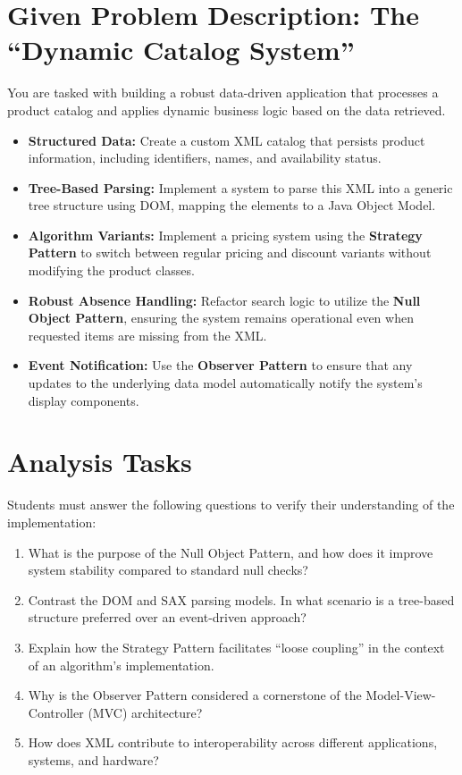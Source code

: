 \documentclass[11pt]{article}
\begin{document}
\section*{Given Problem Description: The ``Dynamic Catalog System''}
You are tasked with building a robust data-driven application that processes a product catalog and applies dynamic business logic based on the data retrieved.
\begin{itemize}
    \item \textbf{Structured Data:} Create a custom XML catalog that persists product information, including identifiers, names, and availability status.
    \item \textbf{Tree-Based Parsing:} Implement a system to parse this XML into a generic tree structure using DOM, mapping the elements to a Java Object Model.
    \item \textbf{Algorithm Variants:} Implement a pricing system using the \textbf{Strategy Pattern} to switch between regular pricing and discount variants without modifying the product classes.
    \item \textbf{Robust Absence Handling:} Refactor search logic to utilize the \textbf{Null Object Pattern}, ensuring the system remains operational even when requested items are missing from the XML.
    \item \textbf{Event Notification:} Use the \textbf{Observer Pattern} to ensure that any updates to the underlying data model automatically notify the system's display components.
\end{itemize}

\section*{Analysis Tasks}
Students must answer the following questions to verify their understanding of the implementation:
\begin{enumerate}
    \item What is the purpose of the Null Object Pattern, and how does it improve system stability compared to standard null checks? 
    \item Contrast the DOM and SAX parsing models. In what scenario is a tree-based structure preferred over an event-driven approach? 
    \item Explain how the Strategy Pattern facilitates ``loose coupling'' in the context of an algorithm's implementation.
    \item Why is the Observer Pattern considered a cornerstone of the Model-View-Controller (MVC) architecture? 
    \item How does XML contribute to interoperability across different applications, systems, and hardware? 
\end{enumerate}
\end{document}

